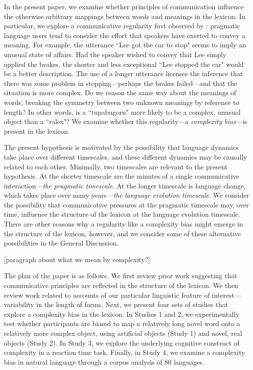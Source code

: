 \documentclass[man]{apa2}
\begin{document}
In the present paper, we examine whether principles of communication influence the otherwise arbitrary mappings between words and meanings in the lexicon. In particular, we explore a communicative regularity first observed by : pragmatic language users tend to consider the effort that speakers have exerted to convey a meaning. For example, the utterance ``Lee got the car to stop" seems to imply an unusual state of affairs. Had the speaker wished to convey that Lee simply applied the brakes, the shorter and less exceptional ``Lee stopped the car" would be a better description. The use of a longer utterance licenses the inference that there was some problem in stopping---perhaps the brakes failed---and that the situation is more complex. Do we reason the same way about the meanings of words, breaking the symmetry between two unknown meanings by reference to length? In other words, is a ``tupabugorn" more likely to be a complex, unusual object than a ``ralex"? We examine whether this  regularity---a {\it complexity bias}---is present in the lexicon.

The present hypothesis is motivated by the possibility that language dynamics take place over different timescales, and these different dynamics may be causally related to each other.  Minimally, two timescales are relevant to the present hypothesis. At the shorter timescale are the minutes of a single communicative interaction---{\it the pragmatic timescale}. At the longer timescale is language change, which takes place over many years---{\it the language evolution timescale}. We consider the possibility that communicative pressures at the pragmatic timescale may, over time, influence the structure of the lexicon at the language evolution timescale. There are other reasons why a regularity like a complexity bias might emerge in the structure of the lexicon, however, and we consider some of these alternative possibilities in the General Discussion.

[paragraph about what we mean by complexity?]

The plan of the paper is as follows. We first review prior work suggesting that communicative principles are reflected in the structure of the lexicon. We then review work related to accounts of our particular linguistic feature of interest---variability in the length of forms. Next, we   present four sets of studies that explore a complexity bias in the lexicon. In Studies 1 and 2, we  experimentally test whether participants are biased to map a relatively long novel word onto a relatively more complex object, using artificial objects (Study 1) and novel, real objects (Study 2). In Study 3, we explore the underlying cognitive construct of complexity in a reaction time task. Finally, in Study 4, we examine a complexity bias in natural language through a corpus analysis of 80 languages.
\end{document}
